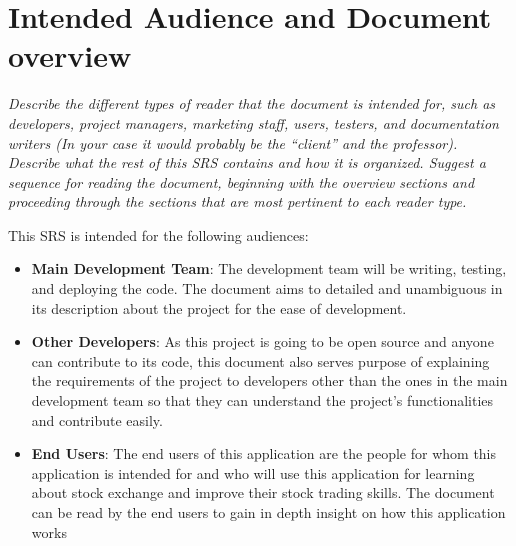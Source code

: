 \documentclass[12 pt, a4paper]{report}
\begin{document}
	\section{Intended Audience and Document overview}
	\textit{Describe the different types of reader that the document is intended for, such as developers, project managers, marketing staff, users, testers, and documentation writers (In your case it would probably be the “client” and the professor). Describe what the rest of this SRS contains and how it is organized. Suggest a sequence for reading the document, beginning with the overview sections and proceeding through the sections that are most pertinent to each reader type.}
	
	This SRS is intended for the following audiences:
	\begin{itemize}
		\item \textbf{Main Development Team}: The development team will be writing, testing, and deploying the code. The document aims to detailed and unambiguous in its description about the project for the ease of development.
		\item \textbf{Other Developers}: As this project is going to be open source and anyone can contribute to its code, this document also serves purpose of explaining the requirements of the project to developers other than the ones in the main development team so that they can understand the project's functionalities and contribute easily.
		\item \textbf{End Users}: The end users of this application are the people for whom this application is intended for and who will use this application for learning about stock exchange and improve their stock trading skills. The document can be read by the end users to gain in depth insight on how this application works
	\end{itemize}
\end{document}
